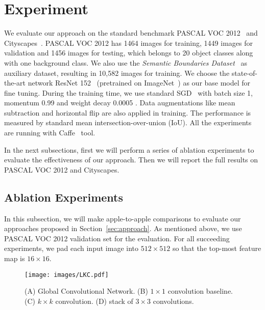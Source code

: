 \documentclass[10pt,twocolumn,letterpaper]{article}
\begin{document}
\section{Experiment}
	We evaluate our approach on the standard benchmark PASCAL VOC 2012~\cite{everingham2010pascal,everingham2015pascal} and Cityscapes~\cite{cordts2016cityscapes}. PASCAL VOC 2012 has 1464 images for training, 1449 images for validation and 1456 images for testing, which belongs to 20 object classes along with one background class. We also use the \emph{Semantic Boundaries Dataset}~\cite{hariharan2011semantic} as auxiliary dataset, resulting in 10,582 images for training. We choose the state-of-the-art network ResNet 152~\cite{He_2016_CVPR} (pretrained on ImageNet~\cite{ILSVRC15}) as our base model for fine tuning. During the training time, we use standard SGD~\cite{krizhevsky2012imagenet} with batch size 1, momentum 0.99 and weight decay 0.0005 . Data augmentations like mean subtraction and horizontal flip are also applied in training. The performance is measured by standard mean intersection-over-union (IoU). All the experiments are running with Caffe~\cite{jia2014caffe} tool.
	


\par
	In the next subsections, first we will perform a series of ablation experiments to evaluate the effectiveness of our approach. Then we will report the full results on PASCAL VOC 2012 and Cityscapes.
\subsection{Ablation Experiments}
   \label{subsec:mod-comp}
	In this subsection, we will make apple-to-apple comparisons to evaluate our approaches proposed in Section~\ref{sec:approach}. As mentioned above, we use PASCAL VOC 2012 validation set for the evaluation. For all succeeding experiments, we pad each input image into $512\times 512$ so that the top-most feature map is $16\times 16$. 
   \begin{figure}[h]
      \begin{center}
         \texttt{[image: images/LKC.pdf]}
      \end{center}
      \caption{(A) Global Convolutional Network. (B) $1\times 1$ convolution baseline. (C) $k\times k$ convolution. (D) stack of $3\times 3$ convolutions. }
      \label{fig:lkc}
   \end{figure}
\end{document}
